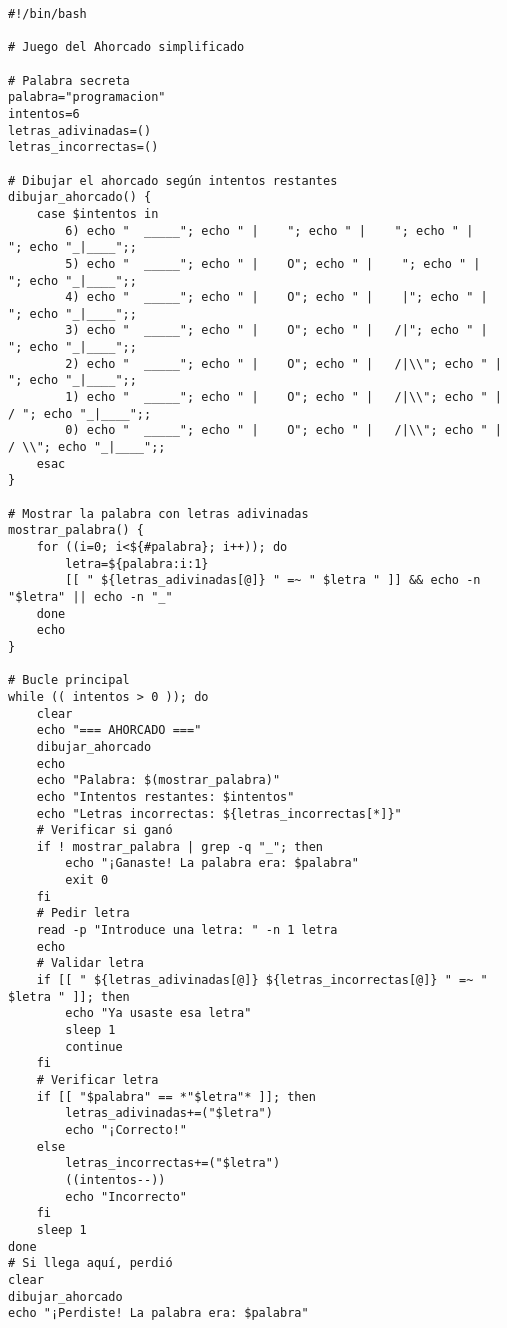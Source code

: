 \documentclass[12pt]{article}
\begin{document}
\begin{lstlisting}[caption={Ahorcado.sh}]
#!/bin/bash

# Juego del Ahorcado simplificado

# Palabra secreta
palabra="programacion"
intentos=6
letras_adivinadas=()
letras_incorrectas=()

# Dibujar el ahorcado según intentos restantes
dibujar_ahorcado() {
    case $intentos in
        6) echo "  _____"; echo " |    "; echo " |    "; echo " |    "; echo "_|____";;
        5) echo "  _____"; echo " |    O"; echo " |    "; echo " |    "; echo "_|____";;
        4) echo "  _____"; echo " |    O"; echo " |    |"; echo " |    "; echo "_|____";;
        3) echo "  _____"; echo " |    O"; echo " |   /|"; echo " |    "; echo "_|____";;
        2) echo "  _____"; echo " |    O"; echo " |   /|\\"; echo " |    "; echo "_|____";;
        1) echo "  _____"; echo " |    O"; echo " |   /|\\"; echo " |   / "; echo "_|____";;
        0) echo "  _____"; echo " |    O"; echo " |   /|\\"; echo " |   / \\"; echo "_|____";;
    esac
}

# Mostrar la palabra con letras adivinadas
mostrar_palabra() {
    for ((i=0; i<${#palabra}; i++)); do
        letra=${palabra:i:1}
        [[ " ${letras_adivinadas[@]} " =~ " $letra " ]] && echo -n "$letra" || echo -n "_"
    done
    echo
}

# Bucle principal
while (( intentos > 0 )); do
    clear
    echo "=== AHORCADO ==="
    dibujar_ahorcado
    echo
    echo "Palabra: $(mostrar_palabra)"
    echo "Intentos restantes: $intentos"
    echo "Letras incorrectas: ${letras_incorrectas[*]}"
    # Verificar si ganó
    if ! mostrar_palabra | grep -q "_"; then
        echo "¡Ganaste! La palabra era: $palabra"
        exit 0
    fi
    # Pedir letra
    read -p "Introduce una letra: " -n 1 letra
    echo
    # Validar letra
    if [[ " ${letras_adivinadas[@]} ${letras_incorrectas[@]} " =~ " $letra " ]]; then
        echo "Ya usaste esa letra"
        sleep 1
        continue
    fi
    # Verificar letra
    if [[ "$palabra" == *"$letra"* ]]; then
        letras_adivinadas+=("$letra")
        echo "¡Correcto!"
    else
        letras_incorrectas+=("$letra")
        ((intentos--))
        echo "Incorrecto"
    fi
    sleep 1
done
# Si llega aquí, perdió
clear
dibujar_ahorcado
echo "¡Perdiste! La palabra era: $palabra"

\end{lstlisting}
\end{document}
